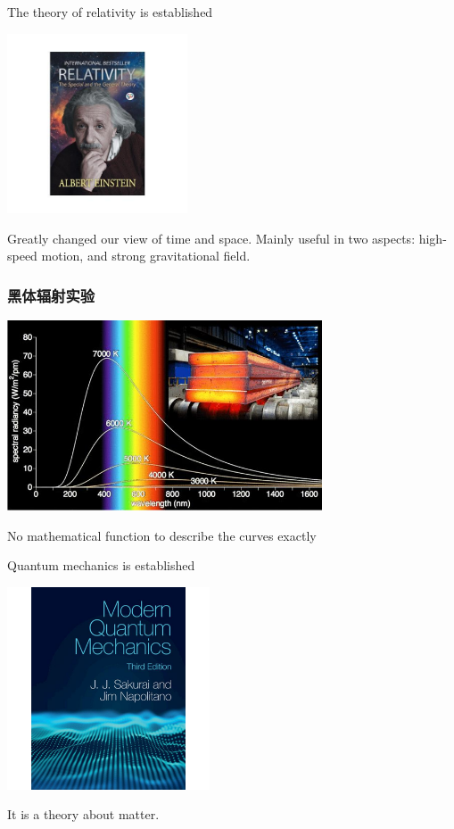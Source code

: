 \begin{frame}
    The theory of relativity is established 
    \begin{center}
        \includegraphics[width=0.4\textwidth]{figs/relativity.jpg}
    \end{center}   
    Greatly changed our view of time and space. Mainly useful in two aspects: high-speed motion, and strong gravitational field. 
\end{frame}

\begin{frame}
    \frametitle{黑体辐射实验}
    \begin{center}
    \includegraphics[width=0.7\textwidth]{figs/2021-12-01-23-47-27.png}
    \end{center}
    No mathematical function to describe the curves exactly 
\end{frame}
\begin{frame}
    Quantum mechanics is established  
    \begin{center}
        \includegraphics[width=0.45\textwidth]{figs/mqm.jpg}
    \end{center}   
    It is a theory about matter.
\end{frame}


